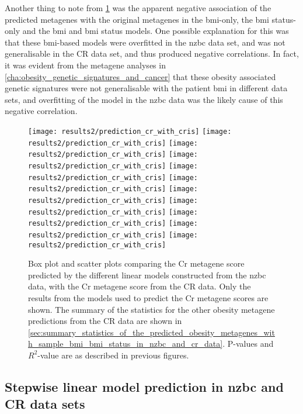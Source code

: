 Another thing to note from \cref{fig:predict_cr_cris} was the apparent negative association of the predicted metagenes with the original metagenes in the \gls{bmi}-only, the \gls{bmi} status-only and the \gls{bmi} and \gls{bmi} status models.
One possible explanation for this was that these \gls{bmi}-based models were overfitted in the \gls{nzbc} data set, and was not generalisable in the CR data set, and thus produced negative correlations.
In fact, it was evident from the metagene analyses in \cref{cha:obesity_genetic_signatures_and_cancer} that these obesity associated genetic signatures were not generalisable with the patient \gls{bmi} in different data sets, and overfitting of the model in the \gls{nzbc} data was the likely cause of this negative correlation.

\begin{figure}[htpb]
	\centering
	\texttt{[image: results2/prediction\_cr\_with\_cris]}
	\texttt{[image: results2/prediction\_cr\_with\_cris]}
	\texttt{[image: results2/prediction\_cr\_with\_cris]}
	\texttt{[image: results2/prediction\_cr\_with\_cris]}
	\texttt{[image: results2/prediction\_cr\_with\_cris]}
	\texttt{[image: results2/prediction\_cr\_with\_cris]}
	\texttt{[image: results2/prediction\_cr\_with\_cris]}
	\texttt{[image: results2/prediction\_cr\_with\_cris]}
	\texttt{[image: results2/prediction\_cr\_with\_cris]}
	\texttt{[image: results2/prediction\_cr\_with\_cris]}
	\texttt{[image: results2/prediction\_cr\_with\_cris]}
	\caption[Comparison of the predicted Cr metagene scores with the Cr metagene score from the CR data]{ Box plot and scatter plots comparing the Cr metagene score predicted by the different linear models constructed from the \gls{nzbc} data, with the Cr metagene score from the CR data.
	Only the results from the models used to predict the Cr metagene scores are shown.
	The summary of the statistics for the other obesity metagene predictions from the CR data are shown in \cref{sec:summary_statistics_of_the_predicted_obesity_metagenes_with_sample_bmi_bmi_status_in_nzbc_and_cr_data}.
	P-values and $R^2$-value are as described in previous figures.
	}
	\label{fig:predict_cr_cris}
\end{figure}

\subsection{Stepwise linear model prediction in \gls{nzbc} and CR data sets}
\label{sub:stepwise_linear_model_prediction_in_nzbc_and_cr_data_sets}

